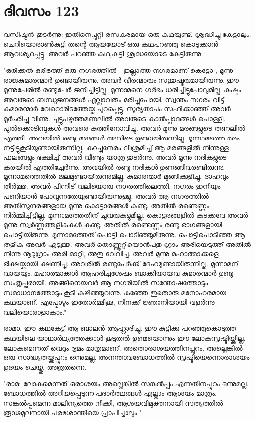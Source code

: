 \newpage
\section{ദിവസം 123}


വസിഷ്ഠന്‍ തുടര്‍ന്നു: ഇതിനെപ്പറ്റി രസകരമായ ഒരു കഥയുണ്ട്‌. ശ്രദ്ധിച്ചു കേട്ടാലും. ചെറിയൊരാണ്‍കുട്ടി തന്റെ ആയയോട്‌ ഒരു കഥപറഞ്ഞു കൊടുക്കാന്‍ ആവശ്യപ്പെട്ടു. അവര്‍ പറഞ്ഞ കഥ,കുട്ടി ശ്രദ്ധയോടെ കേട്ടിരുന്നു.

"ഒരിക്കല്‍ ഒരിടത്ത്‌ ഒരു നഗരത്തില്‍ - ഇല്ലാത്ത നഗരമാണ്‌ കെട്ടോ-, മൂന്നു രാജകുമാരന്മാര്‍ ഉണ്ടായിരുന്നു. അവര്‍ വീരന്മാരും സന്തുഷ്ടരുമായിരുന്നു. ഈ മൂന്നുപേരില്‍ രണ്ടുപേര്‍ ജനിച്ചിട്ടില്ല. മൂന്നാമനെ ഗര്‍ഭം ധരിച്ചിട്ടുപോലുമില്ല. കഷ്ടം അവരുടെ ബന്ധുജനങ്ങള്‍ എല്ലാവരും മരിച്ചുപോയി. സ്വന്തം നഗരം വിട്ട്‌ കുമാരന്മാര്‍ വേറൊരിടത്തേയ്ക്കു പുറപ്പെട്ടു. സൂര്യതാപം സഹിക്കാഞ്ഞ്‌ അവര്‍ മൂര്‍ഛിച്ചു വിണു. ചുട്ടുപഴുത്തമണലില്‍ അവരുടെ കാല്‍പ്പാദങ്ങള്‍ പൊള്ളി. പുല്‍ക്കൊടിമ്പുകള്‍ അവരെ കുത്തിനോവിച്ചു. അവര്‍ മൂന്നു മരങ്ങളുടെ തണലില്‍ എത്തി. അവയില്‍ രണ്ടു മരങ്ങള്‍ അവിടെ ഉണ്ടായിരുന്നില്ല. മൂന്നാമത്തെ മരം നട്ടിട്ടുകൂടിയുണ്ടായിരുന്നില്ല. കുറച്ചുനേരം വിശ്രമിച്ച്‌ ആ മരങ്ങളില്‍ നിന്നുള്ള ഫലങ്ങളും ഭക്ഷിച്ച്‌ അവര്‍ വീണ്ടും യാത്ര തുടര്‍ന്നു. അവര്‍ മൂന്നു നദികളുടെ കരയില്‍ എത്തിച്ചേര്‍ന്നു. അവയില്‍ രണ്ടു നദികള്‍ ഉണങ്ങിവരണ്ടിരുന്നു. മൂന്നാമത്തെതില്‍ ജലമുണ്ടായിരുന്നുമില്ല. കുമാരന്മാര്‍ മുങ്ങിക്കുളിച്ചു, ദാഹവും തീര്‍ത്തു.  അവര്‍ പിന്നീട്‌ വലിയൊരു നഗരത്തിലെത്തി. നഗരം ഇനിയും പണിയാന്‍ പോവുന്നതേയുണ്ടായിരുന്നുള്ളു. അവര്‍ ആ നഗരത്തില്‍ അതിസുന്ദരങ്ങളായ മൂന്നു കൊട്ടാരങ്ങള്‍ കണ്ടു. അതില്‍ രണ്ടെണ്ണം നിര്‍മ്മിച്ചിട്ടില്ല. മൂന്നാമത്തേതിന്‌ ചുവരുകളുമില്ല. കൊട്ടരങ്ങളില്‍ കടക്കവേ അവര്‍ മൂന്നു സ്വര്‍ണ്ണത്തളികകള്‍ കണ്ടു. അതില്‍ രണ്ടെണ്ണം രണ്ടു ഭാഗങ്ങളായി പൊട്ടിയിരുന്നു. മൂന്നാമത്തേത്‌ പൊട്ടി പൊടിഞ്ഞുമിരുന്നു. പൊട്ടിപൊടിഞ്ഞ ആ തളിക അവര്‍ എടുത്തു. അവര്‍ തൊണ്ണൂറ്റിയൊന്‍പതു ഗ്രാം അരിയെടുത്ത്‌ അതില്‍ നിന്നു നൂറുഗ്രാം അരി മാറ്റി, അതു വേവിച്ചു. അവര്‍ മൂന്നു മഹാത്മാക്കളെ ഭിക്ഷയ്ക്കായി ക്ഷണിച്ചു. അവരില്‍ രണ്ടുപേര്‍ക്ക്‌ ദേഹമുണ്ടായിരുന്നില്ല. മൂന്നാമന്‌ വായയും. മഹാത്മാക്കള്‍ ആഹരിച്ചശേഷം ബാക്കിയായവ കുമാരന്മാര്‍ ഉണ്ടു സംതൃപ്തരായി. അങ്ങിനെയവര്‍ ആ നഗരിയില്‍ സന്തോഷത്തോടും സമാധാനത്തോടും കൂടി കഴിഞ്ഞുവന്നു. കുഞ്ഞേ ഇതൊരു മനോഹരമായ കഥയാണ്‌. എപ്പോഴും ഇതോര്‍മ്മിക്കൂ, നിനക്ക്‌ ജ്ഞാനിയായി വളര്‍ന്നു വലിയൊരാളാകാം."

രാമാ, ഈ കഥകേട്ട്‌ ആ ബാലന്‍ ആഹ്ലാദിച്ചു. ഈ കുട്ടിക്കു പറഞ്ഞുകൊടുത്ത കഥയിലെ യാഥാര്‍ഥ്യത്തേക്കാള്‍ കൂടുതല്‍ ഉണ്മയൊന്നും ഈ ലോകസൃഷ്ടിയ്ക്കില്ല. ലോകമെന്നത്‌ വെറും ഭ്രമം മാത്രമാണ്‌. അതൊരാശയത്തിനപ്പുറം, അല്ലെങ്കില്‍ ഒരു സാദ്ധ്യതയ്ക്കപ്പുറം  ഒന്നുമല്ല. അനന്താവബോധത്തില്‍ സൃഷ്ടിയെന്നൊരാശയം ഉദയം ചെയ്തു. അത്രതന്നെ.

"രാമ: ലോകമെന്നത്‌ ഒരാശയം അല്ലെങ്കില്‍ സങ്കല്‍പ്പം  എന്നതിനപ്പുറം ഒന്നുമല്ല. ബോധത്തില്‍ അറിയപ്പെടുന്ന പദാര്‍ത്ഥങ്ങള്‍ എല്ലാം ആശയം മാത്രം. സങ്കല്‍പ്പമെന്ന മാലിന്യത്തെ നീക്കി, ആശയവിമുക്തനായി സത്യത്തില്‍ രൂഢമൂലനായി പരമശാന്തിയെ പ്രാപിച്ചാലും." 
